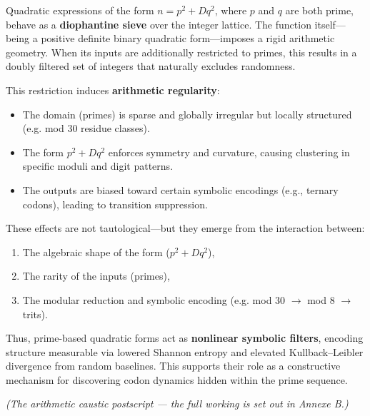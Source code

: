 \begin{tcolorbox}[colback=blue!5!white, colframe=blue!75!black, title=Why Quadratic Prime Forms Encode Structure]

Quadratic expressions of the form \( n = p^2 + Dq^2 \), where \(p\) and \(q\) are both prime, behave as a \textbf{diophantine sieve} over the integer lattice. The function itself—being a positive definite binary quadratic form—imposes a rigid arithmetic geometry. When its inputs are additionally restricted to primes, this results in a doubly filtered set of integers that naturally excludes randomness.

\medskip
This restriction induces \textbf{arithmetic regularity}:
\begin{itemize}
  \item The domain (primes) is sparse and globally irregular but locally structured (e.g. mod 30 residue classes).
  \item The form \( p^2 + Dq^2 \) enforces symmetry and curvature, causing clustering in specific moduli and digit patterns.
  \item The outputs are biased toward certain symbolic encodings (e.g., ternary codons), leading to transition suppression.
\end{itemize}

\medskip
These effects are not tautological—but they emerge from the interaction between:
\begin{enumerate}
  \item The algebraic shape of the form (\(p^2 + Dq^2\)),
  \item The rarity of the inputs (primes),
  \item The modular reduction and symbolic encoding (e.g. mod 30 \(\rightarrow\) mod 8 \(\rightarrow\) trits).
\end{enumerate}

\medskip
Thus, prime-based quadratic forms act as \textbf{nonlinear symbolic filters}, encoding structure measurable via lowered Shannon entropy and elevated Kullback–Leibler divergence from random baselines. This supports their role as a constructive mechanism for discovering codon dynamics hidden within the prime sequence.

\end{tcolorbox}

\textit{(The arithmetic caustic postscript --- the full working is set out in Annexe B.)}

